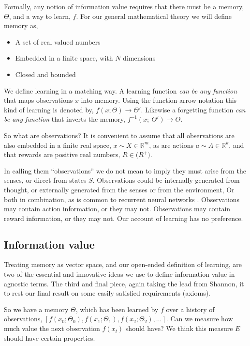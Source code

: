 Formally, any notion of information value requires that there must be a memory, $\Theta$, and a way to learn, $f$. For our general mathematical theory we will define memory as,

\begin{itemize}
\item A set of real valued numbers
\item Embedded in a finite space, with $N$ dimensions 
\item Closed and bounded
\end{itemize}

We define learning in a matching way. A learning function \textit{can be any function} that maps observations $x$ into memory. Using the function-arrow notation this kind of learning is denoted by, $f(x;\Theta) \rightarrow \Theta'$. Likewise a forgetting function \textit{can be any function} that inverts the memory, $f^{-1}(x;\ \Theta') \rightarrow \Theta$. 

So what are observations? It is convenient to assume that all observations are also embedded in a finite real space, $x \sim X \in \mathbb{R}^m$, as are actions $a \sim A \in \mathbb{R}^k$, and that rewards are positive real numbers, $R \in \mathbb(R^{+})$. 

In calling them ``observations'' we do not mean to imply they must arise from the senses, or direct from states $S$. Observations could be internally generated from thought, or externally generated from the senses or from the environment, Or both in combination, as is common to recurrent neural networks . Observations may contain action information, or they may not. Observations may contain reward information, or they may not. Our account of learning has no preference.

\subsection{Information value} 
Treating memory as vector space, and our open-ended definition of learning, are two of the essential and innovative ideas we use to define information value in agnostic terms. The third and final piece, again taking the lead from Shannon, it to rest our final result on some easily satisfied requirements (axioms).

So we have a memory $\Theta$, which has been learned by $f$ over a history of observations, $[f(x_0; \Theta_0), f(x_1; \Theta_1), f(x_2; \Theta_2), \ldots]$. Can we measure how much value the next observation $f(x_t)$ should have? We think this measure $E$ should have certain properties.

